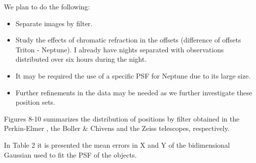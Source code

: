 \documentclass[12pt,a4paper]{report}
\newcommand{\PE}{Perkin-Elmer }
\newcommand{\BC}{Boller \& Chivens }
\begin{document}
We plan to do the following:
\begin{itemize}
\item Separate images by filter.
\item Study the effects of chromatic refraction in the offsets (difference of offsets Triton - Neptune). I already have nights separated with observations distributed over six hours during the night.
\item It may be required the use of a specific PSF for Neptune due to its large size.
\item Further refinements in the data may be needed as we further investigate these position sets.
\end{itemize}

Figures 8-10 summarizes the distribution of positions by filter obtained in the \PE , the \BC and the Zeiss telescopes, respectively.


In Table 2 it is presented the mean errors in X and Y of the bidimensional Gaussian used to fit the PSF of the objects. %
\end{document}

